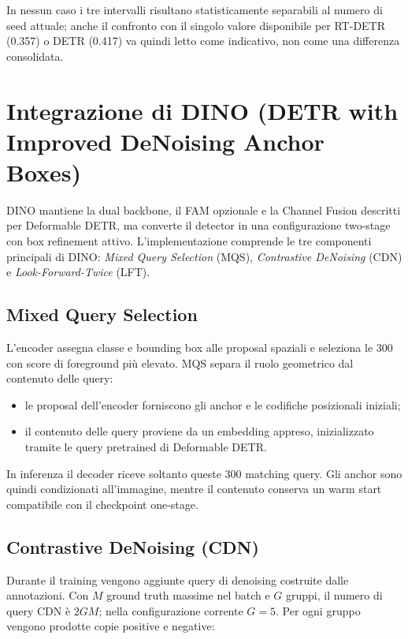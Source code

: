 \documentclass[a4paper,11pt]{article}
\begin{document}
In nessun caso i tre intervalli risultano statisticamente separabili al numero di seed attuale; anche il confronto con il singolo valore disponibile per RT-DETR (0.357) o DETR (0.417) va quindi letto come indicativo, non come una differenza consolidata.

\newpage

\section{Integrazione di DINO (DETR with Improved DeNoising Anchor Boxes)}

DINO mantiene la dual backbone, il FAM opzionale e la Channel Fusion descritti per Deformable DETR, ma converte il detector in una configurazione two-stage con box refinement attivo. L'implementazione comprende le tre componenti principali di DINO: \textit{Mixed Query Selection} (MQS), \textit{Contrastive DeNoising} (CDN) e \textit{Look-Forward-Twice} (LFT).

\subsection{Mixed Query Selection}

L'encoder assegna classe e bounding box alle proposal spaziali e seleziona le 300 con score di foreground più elevato. MQS separa il ruolo geometrico dal contenuto delle query:

\begin{itemize}
    \item le proposal dell'encoder forniscono gli anchor e le codifiche posizionali iniziali;
    \item il contenuto delle query proviene da un embedding appreso, inizializzato tramite le query pretrained di Deformable DETR.
\end{itemize}

In inferenza il decoder riceve soltanto queste 300 matching query. Gli anchor sono quindi condizionati all'immagine, mentre il contenuto conserva un warm start compatibile con il checkpoint one-stage.

\subsection{Contrastive DeNoising (CDN)}

Durante il training vengono aggiunte query di denoising costruite dalle annotazioni. Con $M$ ground truth massime nel batch e $G$ gruppi, il numero di query CDN è $2GM$; nella configurazione corrente $G=5$. Per ogni gruppo vengono prodotte copie positive e negative:
\end{document}
